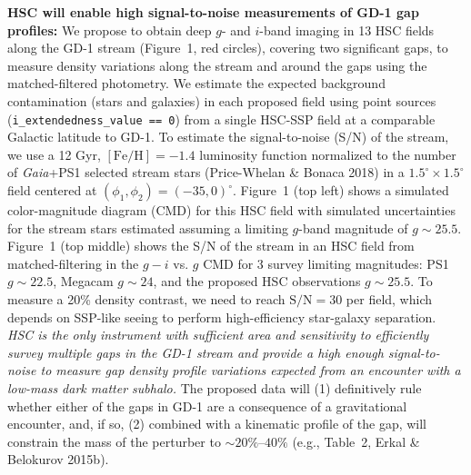 \documentclass[11pt]{article}
\begin{document}
\textbf{HSC will enable high signal-to-noise measurements of GD-1 gap profiles:}
We propose to obtain deep $g$- and $i$-band imaging in 13 HSC fields along the GD-1 stream (Figure~1, red circles), covering two significant gaps, to measure density variations along the stream and around the gaps using the matched-filtered photometry.
We estimate the expected background contamination (stars and galaxies) in each proposed field using point sources (\texttt{i\_extendedness\_value == 0}) from a single HSC-SSP field at a comparable Galactic latitude to GD-1.
To estimate the signal-to-noise (S/N) of the stream, we use a 12 Gyr, $[\textrm{Fe}/\textrm{H}] = -1.4$ luminosity function normalized to the number of \textit{Gaia}+PS1 selected stream stars (Price-Whelan \& Bonaca 2018) in a $1.5^\circ \times 1.5^\circ$ field centered at $(\phi_1, \phi_2) = (-35, 0)^\circ$.
Figure~1 (top left) shows a simulated color-magnitude diagram (CMD) for this HSC field with simulated uncertainties for the stream stars estimated assuming a limiting $g$-band magnitude of $g \sim 25.5$.
Figure~1 (top middle) shows the S/N of the stream in an HSC field from matched-filtering in the $g-i$ vs. $g$ CMD for 3 survey limiting magnitudes: PS1 $g \sim 22.5$, Megacam $g \sim 24$, and the proposed HSC observations $g \sim 25.5$.
To measure a 20\% density contrast, we need to reach $\textrm{S}/\textrm{N} = 30$ per field, which depends on SSP-like seeing to perform high-efficiency star-galaxy separation.
\emph{HSC is the only instrument with sufficient area and sensitivity to efficiently survey multiple gaps in the GD-1 stream and provide a high enough signal-to-noise to measure gap density profile variations expected from an encounter with a low-mass dark matter subhalo.}
The proposed data will (1) definitively rule whether either of the gaps in GD-1 are a consequence of a gravitational encounter, and, if so, (2) combined with a kinematic profile of the gap, will constrain the mass of the perturber to $\sim 20\%$--$40\%$ (e.g., Table~2, Erkal \& Belokurov 2015b).
\end{document}

